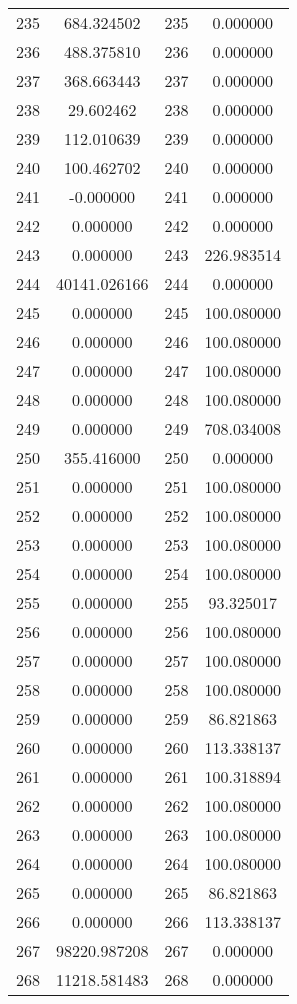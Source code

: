 \documentclass[12pt]{article}
\begin{document}
\begin{longtable}{@{}cccc@{}}
235 & 684.324502 & 235 & 0.000000 \\
236 & 488.375810 & 236 & 0.000000 \\
237 & 368.663443 & 237 & 0.000000 \\
238 & 29.602462 & 238 & 0.000000 \\
239 & 112.010639 & 239 & 0.000000 \\
240 & 100.462702 & 240 & 0.000000 \\
241 & -0.000000 & 241 & 0.000000 \\
242 & 0.000000 & 242 & 0.000000 \\
243 & 0.000000 & 243 & 226.983514 \\
244 & 40141.026166 & 244 & 0.000000 \\
245 & 0.000000 & 245 & 100.080000 \\
246 & 0.000000 & 246 & 100.080000 \\
247 & 0.000000 & 247 & 100.080000 \\
248 & 0.000000 & 248 & 100.080000 \\
249 & 0.000000 & 249 & 708.034008 \\
250 & 355.416000 & 250 & 0.000000 \\
251 & 0.000000 & 251 & 100.080000 \\
252 & 0.000000 & 252 & 100.080000 \\
253 & 0.000000 & 253 & 100.080000 \\
254 & 0.000000 & 254 & 100.080000 \\
255 & 0.000000 & 255 & 93.325017 \\
256 & 0.000000 & 256 & 100.080000 \\
257 & 0.000000 & 257 & 100.080000 \\
258 & 0.000000 & 258 & 100.080000 \\
259 & 0.000000 & 259 & 86.821863 \\
260 & 0.000000 & 260 & 113.338137 \\
261 & 0.000000 & 261 & 100.318894 \\
262 & 0.000000 & 262 & 100.080000 \\
263 & 0.000000 & 263 & 100.080000 \\
264 & 0.000000 & 264 & 100.080000 \\
265 & 0.000000 & 265 & 86.821863 \\
266 & 0.000000 & 266 & 113.338137 \\
267 & 98220.987208 & 267 & 0.000000 \\
268 & 11218.581483 & 268 & 0.000000 \\

\end{longtable}
\end{document}
